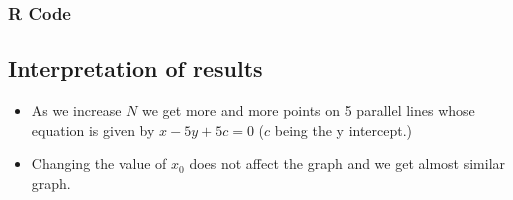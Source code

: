 \documentclass[10pt]{article}
\begin{document}
\subsubsection{R Code}

\subsection{Interpretation of results}
\begin{itemize}
\item As we increase $N$ we get more and more points on 5 parallel lines whose equation is given by  $x-5y+5c=0$ ($c$ being the y intercept.)
\item Changing the value of $x_0$ does not affect the graph and we get almost similar graph.
\end{itemize}
\end{document}
